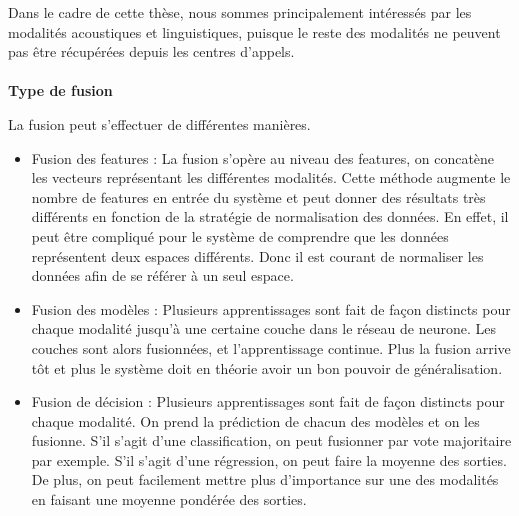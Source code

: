 Dans le cadre de cette thèse, nous sommes principalement intéressés par les modalités acoustiques et linguistiques, puisque le reste des modalités ne peuvent pas être récupérées depuis les centres d'appels.
\\
\\
\textbf{Type de fusion}

La fusion peut s'effectuer de différentes manières.
\begin{itemize}
  \item Fusion des features : La fusion s'opère au niveau des features, on concatène les vecteurs représentant les différentes modalités. Cette méthode augmente le nombre de features en entrée du système et peut donner des résultats très différents en fonction de la stratégie de normalisation des données. En effet, il peut être compliqué pour le système de comprendre que les données représentent deux espaces différents. Donc il est courant de normaliser les données afin de se référer à un seul espace.
  \item Fusion des modèles : Plusieurs apprentissages sont fait de façon distincts pour chaque modalité jusqu'à une certaine couche dans le réseau de neurone. Les couches sont alors fusionnées, et l'apprentissage continue. Plus la fusion arrive tôt et plus le système doit en théorie avoir un bon pouvoir de généralisation.
  \item Fusion de décision : Plusieurs apprentissages sont fait de façon distincts pour chaque modalité. On prend la prédiction de chacun des modèles et on les fusionne. S'il s'agit d'une classification, on peut fusionner par vote majoritaire par exemple. S'il s'agit d'une régression, on peut faire la moyenne des sorties. De plus, on peut facilement mettre plus d'importance sur une des modalités en faisant une moyenne pondérée des sorties.
\end{itemize}

%
% 
%

